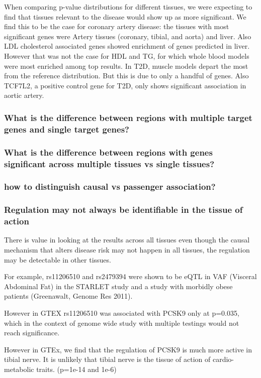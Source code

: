 \documentclass[10pt]{article}
\begin{document}
 When comparing p-value distributions for different tissues, we were expecting to find that tissues relevant to the disease would show up as more significant. We find this to be the case for coronary artery disease: the tissues with most significant genes were Artery tissues (coronary, tibial, and aorta) and liver. Also LDL cholesterol associated genes showed enrichment of genes predicted in liver. However that was not the case for HDL and TG, for which whole blood models were most enriched among top results. In T2D, muscle models depart the most from the reference distribution. But this is due to only a handful of genes. Also TCF7L2, a positive control gene for T2D, only shows significant association in aortic artery.

\subsubsection*{What is the difference between regions with multiple target genes and single target genes?}
\subsubsection*{What is the difference between regions with genes significant across multiple tissues vs single tissues?}
\subsubsection*{how to distinguish causal vs passenger association?}

\subsubsection*{Regulation may not always be identifiable in the tissue of action}

There is value in looking at the results across all tissues even though the causal mechanism that alters disease risk may not happen in all tissues, the regulation may be detectable in other tissues.

For example, rs11206510 and rs2479394 were shown to be eQTL in VAF (Visceral Abdominal Fat) in the STARLET study and a study with morbidly obese patients (Greenawalt, Genome Res 2011). 

However in GTEX rs11206510 was associated with PCSK9 only at p=0.035, which in the context of genome wide study with multiple testings would not reach significance. 


However in GTEx, we find that the regulation of PCSK9 is much more active in tibial nerve. It is unlikely that tibial nerve is the tissue of action of cardio-metabolic traits. (p=1e-14 and 1e-6)
\end{document}
